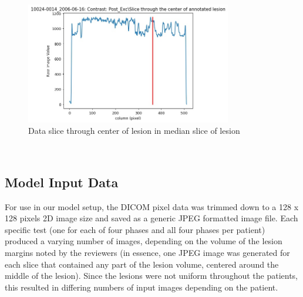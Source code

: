 \documentclass[conference]{IEEEtran}
\begin{document}
\hfill \\
\newpage


\begin{figure}[h]
\includegraphics[width=9cm]{data_slice_10024-0014_2006-06-16_0045}
  \caption{Data slice through center of lesion in median slice of lesion}
  \label{fig:Slice through center of lesion margin}
\end{figure}


\hfill \\

\subsection{Model Input Data}
For use in our model setup, the DICOM pixel data was trimmed down to a 128 x 128 pixels 2D image size and saved as a generic JPEG formatted image file. Each specific test (one for each of four phases and all four phases per patient) produced a varying number of images, depending on the volume of the lesion margins noted by the reviewers (in essence, one JPEG image was generated for each slice that contained any part of the lesion volume, centered around the middle of the lesion). Since the lesions were not uniform throughout the patients, this resulted in differing numbers of input images depending on the patient. \\
\end{document}
